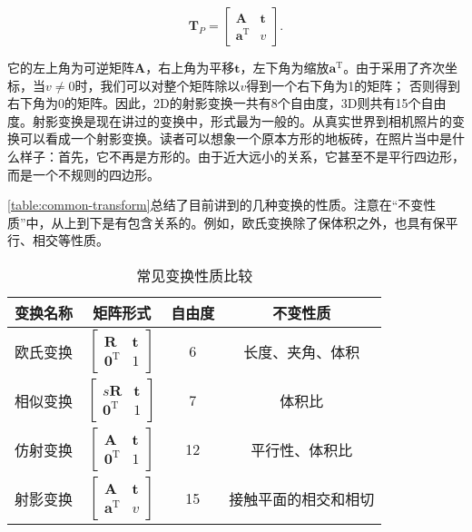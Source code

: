 \begin{enumerate}
	\begin{equation}
	{\bm{T}_P} = \left[ {\begin{array}{*{20}{c}}
		\bm{A} & \bm{t}\\
		{{\bm{a}^\mathrm{T}}} & v
		\end{array}} \right].
	\end{equation}
	
	它的左上角为可逆矩阵$\bm{A}$，右上角为平移$\bm{t}$，左下角为缩放$\bm{a}^\mathrm{T}$。由于采用了齐次坐标，当$v \neq 0$时，我们可以对整个矩阵除以$v$得到一个右下角为1的矩阵； 否则得到右下角为$0$的矩阵。因此，2D的射影变换一共有8个自由度，3D则共有15个自由度。射影变换是现在讲过的变换中，形式最为一般的。从真实世界到相机照片的变换可以看成一个射影变换。读者可以想象一个原本方形的地板砖，在照片当中是什么样子：首先，它不再是方形的。由于近大远小的关系，它甚至不是平行四边形，而是一个不规则的四边形。
\end{enumerate}

\autoref{table:common-transform}总结了目前讲到的几种变换的性质。注意在“不变性质”中，从上到下是有包含关系的。例如，欧氏变换除了保体积之外，也具有保平行、相交等性质。

\begin{table}[!htp]
	\centering
	\caption{常见变换性质比较}
	\label{table:common-transform}
	\begin{tabu}{c|c|c|c}
		\toprule
		变换名称 & 矩阵形式 & 自由度 & 不变性质 \\ \midrule
		欧氏变换 \rule{0pt}{20 pt} & $\left[ {\begin{array}{*{20}{c}}
			\bm{R} & \bm{t}\\
			{{\bm{0}^\mathrm{T}}}&1
			\end{array}} \right]$ & 6 & 长度、夹角、体积 \\ 
		相似变换 \rule{0pt}{20 pt}& $ \left[ {\begin{array}{*{20}{c}}
			{s \bm{R}}& \bm{t}\\
			{{ \bm{0}^\mathrm{T}}}&1
			\end{array}} \right]$ & 7 & 体积比 \\ 
		仿射变换 \rule{0pt}{20 pt}& $ \left[ {\begin{array}{*{20}{c}}
			\bm{A} & \bm{t}\\
			{{\bm{0}^\mathrm{T}}} & 1
			\end{array}} \right]$   & 12 & 平行性、体积比 \\ 
		射影变换 \rule{0pt}{20 pt} & $ \left[ {\begin{array}{*{20}{c}}
			\bm{A} & \bm{t}\\
			{{\bm{a}^\mathrm{T}}} & v
			\end{array}} \right]$ & 15 & 接触平面的相交和相切 \rule{0pt}{20 pt}\\ 
		\bottomrule
	\end{tabu} 
\end{table}

